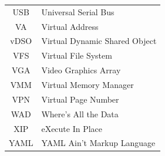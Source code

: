 \documentclass[a4paper,10pt,twoside]{report}
\theoremstyle{definition}
\begin{document}
\begin{supertabular}{cl}
USB & Universal Serial Bus \\
VA & Virtual Address \\
vDSO & Virtual Dynamic Shared Object \\
VFS & Virtual File System \\
VGA & Video Graphics Array \\
VMM & Virtual Memory Manager \\
VPN & Virtual Page Number \\
WAD & Where's All the Data \\
XIP & eXecute In Place \\
YAML & YAML Ain't Markup Language \\
\end{supertabular}
\\
\thispagestyle{empty}


\listoffigures
\thispagestyle{empty}

\renewcommand{\listtablename}{List of Tables}
\listoftables
\thispagestyle{empty}
\end{document}
